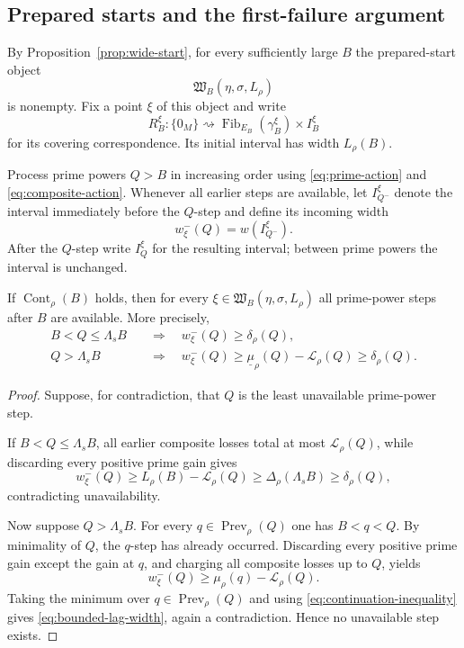 \subsection{Prepared starts and the first-failure argument}

By Proposition~\ref{prop:wide-start}, for every sufficiently large $B$ the prepared-start object
\[
\mathfrak W_B(\eta,\sigma,L_\rho)
\]
is nonempty.  Fix a point $\xi$ of this object and write
\[
R_B^\xi:\{0_M\}\rightsquigarrow
\operatorname{Fib}_{E_B}(\gamma_B^\xi)\times I_B^\xi
\]
for its covering correspondence.  Its initial interval has width $L_\rho(B)$.

Process prime powers $Q>B$ in increasing order using \eqref{eq:prime-action} and \eqref{eq:composite-action}.  Whenever all earlier steps are available, let $I_{Q^-}^\xi$ denote the interval immediately before the $Q$-step and define its incoming width
\begin{equation}\label{eq:incoming-width}
w_\xi^-(Q)=w(I_{Q^-}^\xi).
\end{equation}
After the $Q$-step write $I_Q^\xi$ for the resulting interval; between prime powers the interval is unchanged.

\begin{lemma}[Continuation]\label{lem:component-count-continuation}
If $\operatorname{Cont}_\rho(B)$ holds, then for every $\xi\in\mathfrak W_B(\eta,\sigma,L_\rho)$ all prime-power steps after $B$ are available.  More precisely,
\begin{align}
B<Q\le\Lambda_sB
&\quad\Longrightarrow\quad
w_\xi^-(Q)\ge\delta_\rho(Q),\label{eq:startup-width-bound}\\
Q>\Lambda_sB
&\quad\Longrightarrow\quad
w_\xi^-(Q)\ge
\underline\mu_\rho(Q)-\mathcal L_\rho(Q)
\ge\delta_\rho(Q).\label{eq:bounded-lag-width}
\end{align}
\end{lemma}

\begin{proof}
Suppose, for contradiction, that $Q$ is the least unavailable prime-power step.

If $B<Q\le\Lambda_sB$, all earlier composite losses total at most $\mathcal L_\rho(Q)$, while discarding every positive prime gain gives
\[
w_\xi^-(Q)
\ge L_\rho(B)-\mathcal L_\rho(Q)
\ge\Delta_\rho(\Lambda_sB)
\ge\delta_\rho(Q),
\]
contradicting unavailability.

Now suppose $Q>\Lambda_sB$.  For every $q\in\operatorname{Prev}_\rho(Q)$ one has $B<q<Q$.  By minimality of $Q$, the $q$-step has already occurred.  Discarding every positive prime gain except the gain at $q$, and charging all composite losses up to $Q$, yields
\[
w_\xi^-(Q)\ge\mu_\rho(q)-\mathcal L_\rho(Q).
\]
Taking the minimum over $q\in\operatorname{Prev}_\rho(Q)$ and using \eqref{eq:continuation-inequality} gives \eqref{eq:bounded-lag-width}, again a contradiction.  Hence no unavailable step exists.
\end{proof}

